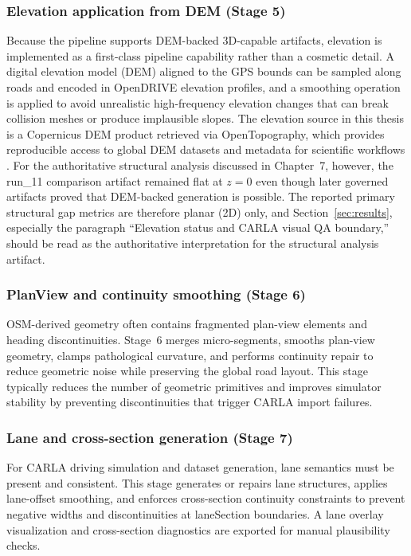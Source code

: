 \subsubsection{Elevation application from DEM (Stage 5)}
Because the pipeline supports DEM-backed 3D-capable artifacts, elevation is implemented as a first-class pipeline capability rather than a cosmetic detail. A digital elevation model (DEM) aligned to the GPS bounds can be sampled along roads and encoded in OpenDRIVE elevation profiles, and a smoothing operation is applied to avoid unrealistic high-frequency elevation changes that can break collision meshes or produce implausible slopes.
The elevation source in this thesis is a Copernicus DEM product retrieved via OpenTopography, which provides reproducible access to global DEM datasets and metadata for scientific workflows \cite{opentopography,copernicusdem}.
For the authoritative structural analysis discussed in Chapter~7, however, the run\_11 comparison artifact remained flat at $z=0$ even though later governed artifacts proved that DEM-backed generation is possible. The reported primary structural gap metrics are therefore planar (2D) only, and Section~\ref{sec:results}, especially the paragraph ``Elevation status and CARLA visual QA boundary,'' should be read as the authoritative interpretation for the structural analysis artifact.

\subsubsection{PlanView and continuity smoothing (Stage 6)}
OSM-derived geometry often contains fragmented plan-view elements and heading discontinuities. Stage~6 merges micro-segments, smooths plan-view geometry, clamps pathological curvature, and performs continuity repair to reduce geometric noise while preserving the global road layout. This stage typically reduces the number of geometric primitives and improves simulator stability by preventing discontinuities that trigger CARLA import failures.

\subsubsection{Lane and cross-section generation (Stage 7)}
For CARLA driving simulation and dataset generation, lane semantics must be present and consistent. This stage generates or repairs lane structures, applies lane-offset smoothing, and enforces cross-section continuity constraints to prevent negative widths and discontinuities at laneSection boundaries. A lane overlay visualization and cross-section diagnostics are exported for manual plausibility checks.

